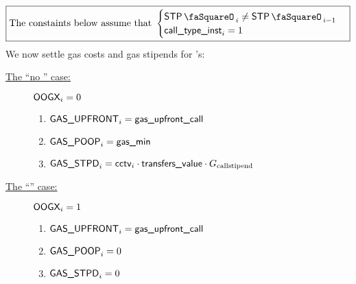 \[
	\boxed{\text{The constaints below assume that }
	\begin{cases}
		\stpStamp_{i} \neq \stpStamp_{i - 1} \\
		\isCall  _{i} =    1                     \\
	\end{cases}}
\]
We now settle gas costs and gas stipends for 's:
\begin{description}
	\item[\underline{The ``no \oogxSH{}'' case:}] \If $\textsf{OOGX}_{i} = 0$ \Then
		\begin{enumerate}
			\item $\textsf{GAS}\textsf{\_UPFRONT}_{i} = \textsf{gas\_upfront}\textsf{\_call}$
			\item $\textsf{GAS}\textsf{\_POOP}_{i} = \textsf{gas\_min}$
			\item $\textsf{GAS}\textsf{\_STPD}_{i} = \textsf{cctv}_{i} \cdot \textsf{transfers\_value} \cdot G_{\text{callstipend}}$
		\end{enumerate}
	\item[\underline{The ``\oogxSH{}'' case:}] \If $\textsf{OOGX}_{i} = 1$ \Then
		\begin{enumerate}
			\item $\textsf{GAS}\textsf{\_UPFRONT}_{i} = \textsf{gas\_upfront}\textsf{\_call}$
			\item $\textsf{GAS}\textsf{\_POOP}_{i} = 0$
			\item $\textsf{GAS}\textsf{\_STPD}_{i} = 0$
		\end{enumerate}
\end{description}
